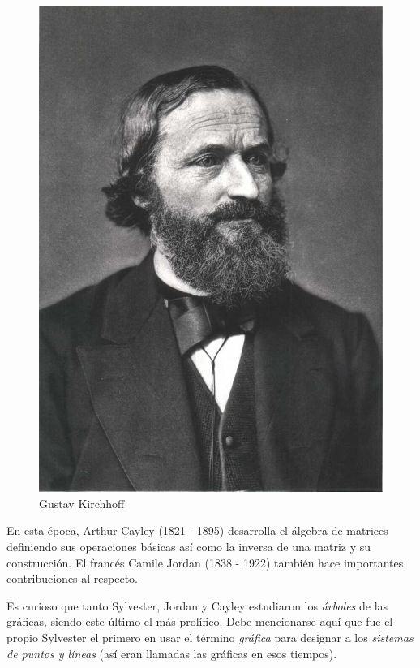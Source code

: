 \begin{figure}
\vspace{-0.5cm}
    \centering
    \includegraphics[scale=0.25]{img/imgintro/kirchoff.jpg}
    \caption{Gustav Kirchhoff}
    \label{fig:veblen}
    \vspace{-0.45cm}
\end{figure}
En esta época, Arthur Cayley (1821 - 1895) desarrolla el álgebra de matrices definiendo sus operaciones básicas así como la inversa de una matriz y su construcción. El francés Camile Jordan (1838 - 1922) también hace importantes contribuciones al respecto.

Es curioso que tanto Sylvester, Jordan y Cayley estudiaron los \textit{árboles} de las gráficas, siendo este último el más prolífico. Debe mencionarse aquí que fue el propio Sylvester el primero en usar el término \textit{gráfica} para designar a los \textit{sistemas de puntos y líneas} (así eran llamadas las gráficas en esos tiempos).

